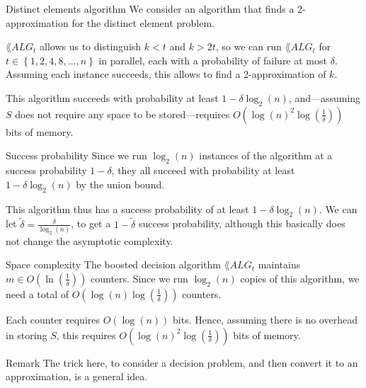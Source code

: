 \documentclass[a4paper]{article}
\begin{document}
\begin{parag}{Distinct elements algorithm}
    We consider an algorithm that finds a 2-approximation for the distinct element problem.

    $\lang{ALG}_t$ allows us to distinguish $k < t$ and $k > 2t$, so we can run $\lang{ALG}_t$ for $t \in \left\{1, 2, 4, 8, \ldots, n\right\}$ in parallel, each with a probability of failure at most $\delta$. Assuming each instance succeeds, this allows to find a 2-approximation of $k$.

    This algorithm succeeds with probability at least $1 - \delta \log_2\left(n\right)$, and---assuming $S$ does not require any space to be stored---requires $O\left(\log\left(n\right)^2 \log\left(\frac{1}{\delta}\right)\right)$ bits of memory.

    \begin{subparag}{Success probability}
        Since we run $\log_2\left(n\right)$ instances of the algorithm at a success probability $1 - \delta$, they all succeed with probability at least $1 - \delta \log_2\left(n\right)$ by the union bound.

        This algorithm thus has a success probability of at least $1 - \delta \log_2\left(n\right)$. We can let $\widetilde{\delta} = \frac{\delta}{\log_2\left(n\right)}$, to get a $1 - \widetilde{\delta}$ success probability, although this basically does not change the asymptotic complexity.
    \end{subparag}

    \begin{subparag}{Space complexity}
        The boosted decision algorithm $\lang{ALG}_t$ maintains $m \in O\left(\ln\left(\frac{1}{\delta}\right)\right)$ counters. Since we run $\log_{2}\left(n\right)$ copies of this algorithm, we need a total of $O\left(\log\left(n\right) \log\left(\frac{1}{\delta}\right)\right)$ counters. 

        Each counter requires $O\left(\log\left(n\right)\right)$ bits. Hence, assuming there is no overhead in storing $S$, this requires $O\left(\log\left(n\right)^2 \log\left(\frac{1}{\delta}\right)\right)$ bits of memory.
    \end{subparag}

    \begin{subparag}{Remark}
        The trick here, to consider a decision problem, and then convert it to an approximation, is a general idea. 
    \end{subparag}
\end{parag}
\end{document}
